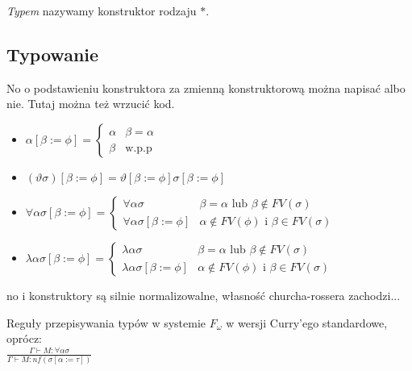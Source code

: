 \documentclass[11pt,leqno]{article}
\begin{document}
\begin{definicja}
\emph{Typem} nazywamy konstruktor rodzaju $\ast$.
\end{definicja}

\subsection{Typowanie}

\begin{definicja}
No o podstawieniu konstruktora za zmienną konstruktorową można napisać albo nie. Tutaj można też wrzucić kod.
    \begin{itemize}
        \item $\alpha [\beta := \phi]= \begin{cases}  \alpha & \beta=\alpha \\ \beta & \text{w.p.p} \end{cases}$
        \item $(\vartheta \sigma) [\beta := \phi] = \vartheta [\beta := \phi] \sigma [\beta := \phi]$
        \item $\forall \alpha \sigma [\beta := \phi]= \begin{cases} \forall \alpha \sigma & \beta=\alpha \text{ lub } \beta \notin FV(\sigma)\\ \forall \alpha \sigma [\beta := \phi] & \alpha \notin FV(\phi)  \text{ i } \beta \in FV(\sigma) \end{cases}$
        \item $\lambda \alpha \sigma [\beta := \phi]= \begin{cases} \lambda \alpha \sigma & \beta=\alpha \text{ lub } \beta \notin FV(\sigma)\\ \lambda \alpha \sigma [\beta := \phi] & \alpha \notin FV(\phi)  \text{ i } \beta \in FV(\sigma) \end{cases}$
    \end{itemize}
\end{definicja}

no i konstruktory są silnie normalizowalne, własność churcha-rossera zachodzi...

\begin{definicja}
Reguły przepisywania typów w systemie $F_{\omega}$ w wersji Curry'ego standardowe, oprócz: \\

$\frac{\Gamma \vdash M : \forall \alpha \sigma}{\Gamma \vdash M : nf(\sigma [ \alpha := \tau ])}$

\end{definicja}
\end{document}
